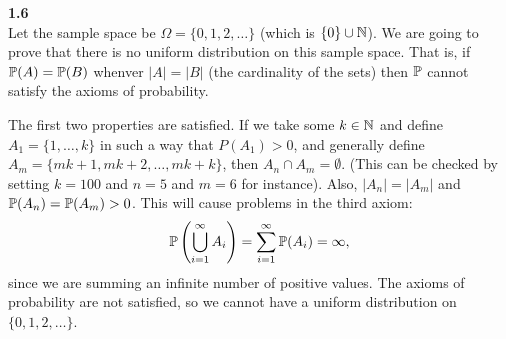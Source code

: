 \bigskip\noindent
\textbf{1.6}\\  %
Let the sample space be $\Omega = \{0, 1, 2, \ldots\}$ (which is $\{0\}\cup\N$). We are going to prove that there
is no uniform distribution on this sample space. That is, if $\P(A) = \P(B)$ whenver $|A| = |B|$ (the cardinality of the sets)
then $\P$ cannot satisfy the axioms of probability. 

The first two properties are satisfied. If we take some $k\in\N$ and define $A_1 = \{1, \ldots, k\}$ in such a way that
$P(A_1) > 0$, and generally define $A_m = \{mk+1, mk+2, \ldots, mk + k\}$, then $A_n\cap A_m = \emptyset$. (This can be
checked by setting $k=100$ and $n=5$ and $m=6$ for instance). Also, $|A_n| = |A_m|$ and $\P(A_n) = \P(A_m) > 0$.
This will cause problems in the third axiom:
$$
\P\left(\bigcup_{i=1}^\infty A_i\right) = \sum_{i=1}^\infty \P(A_i) = \infty,
$$
since we are summing an infinite number of positive values. The axioms of probability are not satisfied, so we cannot
have a uniform distribution on $\{0, 1, 2, \ldots\}$.

